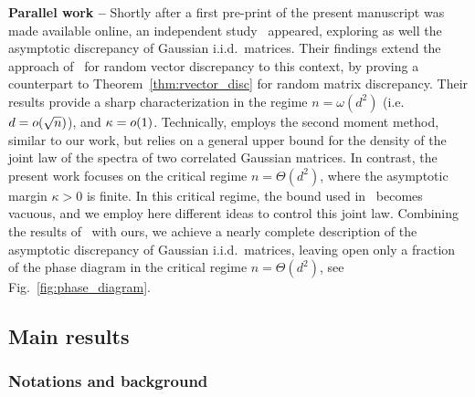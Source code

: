 \myskip 
\textbf{Parallel work --} 
Shortly after a first pre-print of the present manuscript was made available online, an independent study~\citep{wengiel2024asymptotic} appeared, exploring as well the asymptotic discrepancy of Gaussian i.i.d.\ matrices.
Their findings extend the approach of~\cite{turner2020balancing} for random vector discrepancy to this context,
by proving a counterpart to Theorem~\ref{thm:rvector_disc} for random matrix discrepancy.
Their results provide a sharp characterization in the regime $n = \omega(d^2)$ (i.e.\ $d = o(\sqrt{n})$), and $\kappa = o(1)$.
Technically, \cite{wengiel2024asymptotic} employs the second moment method, similar to our work, 
but relies on a general upper bound for the density of the joint law of the spectra of two correlated Gaussian matrices.
In contrast, the present work focuses on the critical regime $n = \Theta(d^2)$, where the asymptotic margin $\kappa > 0$ is finite.
In this critical regime, the bound used in~\cite{wengiel2024asymptotic} becomes vacuous, and we employ here different ideas to control this joint law.
Combining the results of~\cite{wengiel2024asymptotic} with ours, 
we achieve a nearly complete description of the asymptotic discrepancy of Gaussian i.i.d.\ matrices, 
leaving open only a fraction of the phase diagram in the critical regime $n = \Theta(d^2)$, see Fig.~\ref{fig:phase_diagram}.


\subsection{Main results}

\subsubsection*{Notations and background}

